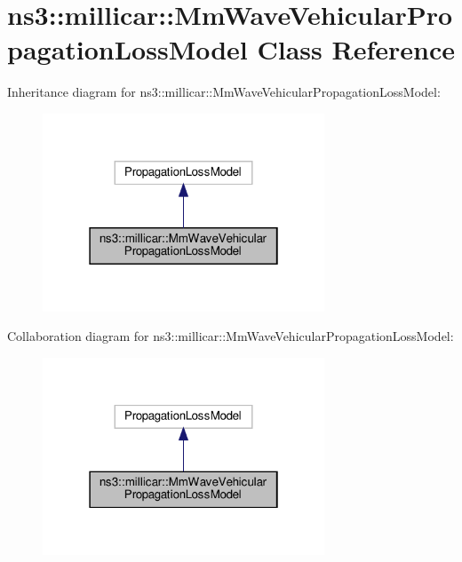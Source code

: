 \hypertarget{classns3_1_1millicar_1_1MmWaveVehicularPropagationLossModel}{}\section{ns3\+:\+:millicar\+:\+:Mm\+Wave\+Vehicular\+Propagation\+Loss\+Model Class Reference}
\label{classns3_1_1millicar_1_1MmWaveVehicularPropagationLossModel}


Inheritance diagram for ns3\+:\+:millicar\+:\+:Mm\+Wave\+Vehicular\+Propagation\+Loss\+Model\+:
\nopagebreak
\begin{figure}[H]
\begin{center}
\leavevmode
\includegraphics[width=238pt]{classns3_1_1millicar_1_1MmWaveVehicularPropagationLossModel__inherit__graph}
\end{center}
\end{figure}


Collaboration diagram for ns3\+:\+:millicar\+:\+:Mm\+Wave\+Vehicular\+Propagation\+Loss\+Model\+:
\nopagebreak
\begin{figure}[H]
\begin{center}
\leavevmode
\includegraphics[width=238pt]{classns3_1_1millicar_1_1MmWaveVehicularPropagationLossModel__coll__graph}
\end{center}
\end{figure}
